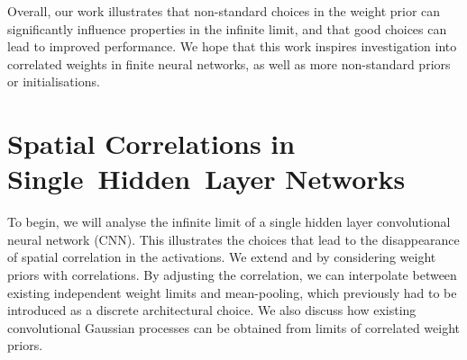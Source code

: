 \documentclass[accepted]{uai2021} %
\newcommand{\0}{\boldsymbol{0}}
\newcommand{\1}{\boldsymbol{1}}
\begin{document}


Overall, our work illustrates that non-standard choices in the weight prior can significantly influence properties in the infinite limit, and that good choices can lead to improved performance. We hope that this work inspires investigation into correlated weights in finite neural networks, as well as more non-standard priors or initialisations.


\section{Spatial Correlations in Single~Hidden~Layer Networks}
\label{sec:single-layer}

To begin, we will analyse the infinite limit of a single hidden layer
convolutional neural network (CNN). This illustrates the choices that lead to the disappearance of spatial correlation in the activations. We extend \citet{garriga2018infiniteconv} and \citet{novak2019infiniteconv} by considering weight priors with correlations. By adjusting the correlation, we can interpolate between existing independent weight limits and mean-pooling, which previously had to be introduced as a discrete architectural choice. We also discuss how existing convolutional Gaussian processes \citep{vdw2017convgp,dutordoir2020} can be obtained from limits of correlated weight priors.

\end{document}

